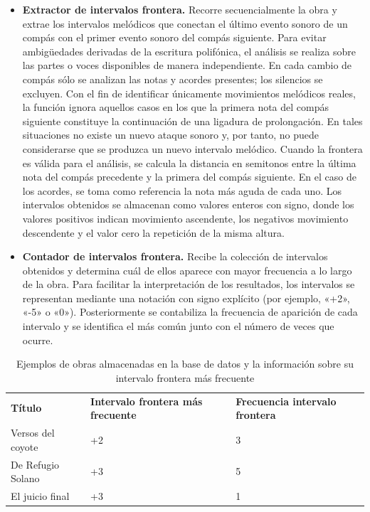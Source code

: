 \begin{itemize}
\item \textbf{Extractor de intervalos frontera.} Recorre secuencialmente la obra y extrae los intervalos melódicos que conectan el último evento sonoro de un compás con el primer evento sonoro del compás siguiente. Para evitar ambigüedades derivadas de la escritura polifónica, el análisis se realiza sobre las partes o voces disponibles de manera independiente. En cada cambio de compás sólo se analizan las notas y acordes presentes; los silencios se excluyen. Con el fin de identificar únicamente movimientos melódicos reales, la función ignora aquellos casos en los que la primera nota del compás siguiente constituye la continuación de una ligadura de prolongación. En tales situaciones no existe un nuevo ataque sonoro y, por tanto, no puede considerarse que se produzca un nuevo intervalo melódico. Cuando la frontera es válida para el análisis, se calcula la distancia en semitonos entre la última nota del compás precedente y la primera del compás siguiente. En el caso de los acordes, se toma como referencia la nota más aguda de cada uno. Los intervalos obtenidos se almacenan como valores enteros con signo, donde los valores positivos indican movimiento ascendente, los negativos movimiento descendente y el valor cero la repetición de la misma altura.
\item \textbf{Contador de intervalos frontera.} Recibe la colección de intervalos obtenidos y determina cuál de ellos aparece con mayor frecuencia a lo largo de la obra. Para facilitar la interpretación de los resultados, los intervalos se representan mediante una notación con signo explícito (por ejemplo, «+2», «-5» o «0»). Posteriormente se contabiliza la frecuencia de aparición de cada intervalo y se identifica el más común junto con el número de veces que ocurre.
\end{itemize}

\begin{table}[H]
\centering
\begin{tabular}{l p{4cm} p{4cm}}
\textbf{Título} & \textbf{Intervalo frontera más frecuente} & \textbf{Frecuencia intervalo frontera} \\
Versos del coyote & +2 & 3 \\
De Refugio Solano & +3 & 5 \\
El juicio final & +3 & 1 \\
\end{tabular}
\caption{Ejemplos de obras almacenadas en la base de datos y la información sobre su intervalo frontera más frecuente}
\end{table}

